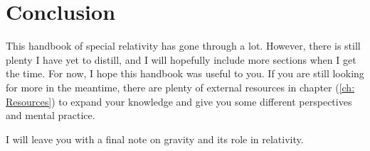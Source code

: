 \chapter{Conclusion}\label{ch: Conclusion}

This handbook of special relativity has gone through a lot.
However, there is still plenty I have yet to distill, and I will hopefully include more sections when I get the time.
For now, I hope this handbook was useful to you.
If you are still looking for more in the meantime, there are plenty of external resources in chapter (\ref{ch: Resources}) to expand your knowledge and give you some different perspectives and mental practice.

I will leave you with a final note on gravity and its role in relativity.








